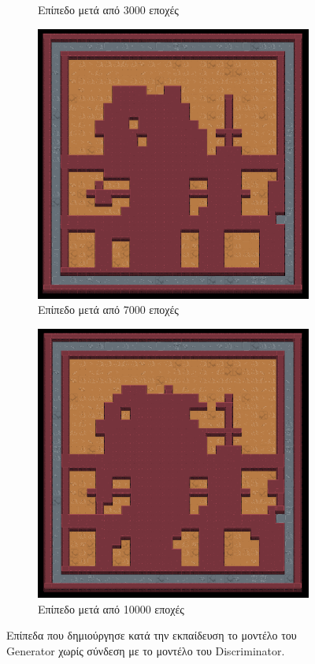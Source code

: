 \begin{figure}[H]
\begin{subfigure}{.5\textwidth}
  \caption{Επίπεδο μετά από 3000 εποχές}
  \label{fig:sfig2}
\end{subfigure}
\begin{subfigure}{.5\textwidth}
  \centering
  \includegraphics[width=.8\linewidth]{../images/result_images/dense-gan/generator_7000.png}
  \caption{Επίπεδο μετά από 7000 εποχές}
  \label{fig:sfig2}
\end{subfigure}
\begin{subfigure}{.5\textwidth}
  \centering
  \includegraphics[width=.8\linewidth]{../images/result_images/dense-gan/generator_10000.png}
  \caption{Επίπεδο μετά από 10000 εποχές}
  \label{fig:sfig2}
\end{subfigure}
\caption{Επίπεδα που δημιούργησε κατά την εκπαίδευση το μοντέλο του Generator χωρίς σύνδεση με το μοντέλο του Discriminator.}
\label{fig:fig}
\end{figure}

